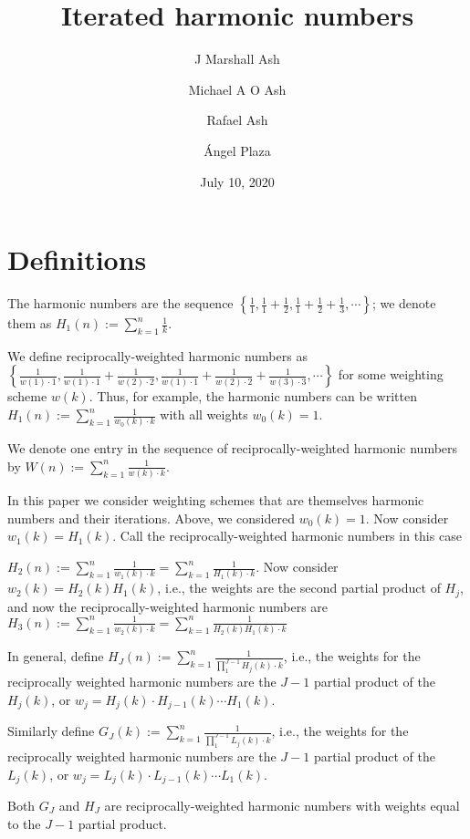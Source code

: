 \documentclass{article}
\begin{document}
\title{Iterated harmonic numbers}
\author{J Marshall Ash \and Michael A O Ash \and Rafael Ash \and \'{A}ngel
Plaza}
\date{July 10, 2020}
\maketitle


\section{Definitions}

The harmonic numbers are the sequence $\left\{ \frac{1}{1},\frac{1}{1}+\frac{1}{2},\frac{1}{1}+\frac{1}{2}+\frac{1}{3},\cdots \right\} $; we denote them as $H_{1}\left( n\right) :=\sum_{k=1}^{n}\frac{1}{k}$. 

We define reciprocally-weighted harmonic numbers as $\left\{ \frac{1}{w(1) \cdot 1},\frac{1}{w(1) \cdot 1}+\frac{1}{w(2) \cdot 2},\frac{1}{w(1) \cdot 1}+\frac{1}{w(2) \cdot 2}+\frac{1}{w(3) \cdot 3},\cdots \right\} $ for some weighting scheme $w(k)$.  Thus, for example, the harmonic numbers can be written $H_{1}\left( n\right) :=\sum_{k=1}^{n}\frac{1}{w_0(k)\cdot k}$ with all weights $w_{0}(k)=1$.

We denote one entry in the sequence of reciprocally-weighted harmonic numbers by $W (n) := \sum_{k=1}^{n} \frac{1}{w(k)\cdot k}$.


In this paper we consider weighting schemes that are themselves harmonic numbers and their iterations. Above, we considered $w_0(k) =1$.  Now consider $w_1(k) = H_{1}(k) $. Call the reciprocally-weighted harmonic numbers in this case

$H_2 (n) := \sum_{k=1}^{n} \frac{1}{w_1(k)\cdot k} = \sum_{k=1}^{n} \frac{1}{H_1(k)\cdot k}$.  Now consider $w_2(k) = H_{2}(k)H_{1}(k) $, i.e., the weights are the second partial product of $H_j$, and now the reciprocally-weighted harmonic numbers are  $H_3 (n) := \sum_{k=1}^{n} \frac{1}{w_2(k)\cdot k} = \sum_{k=1}^{n} \frac{1}{H_{2}(k)H_{1}(k) \cdot k}$

In general, define  $ H_{J}(n) :=   \sum_{k=1}^{n} \frac{1}{\prod_1^{J-1}H_{j}(k)\cdot k} $, i.e., the weights for the reciprocally weighted harmonic numbers are the $J-1$ partial product of the $ H_j(k)$, or $w_j = H_j(k) \cdot H_{j-1}(k) \cdots H_1(k) $.

Similarly define $ G_{J}(k) :=   \sum_{k=1}^{n} \frac{1}{\prod_1^{J-1}L_{j}(k)\cdot k} $, i.e., the weights for the reciprocally weighted harmonic numbers are the $J-1$ partial product of the $ L_j(k)$, or $w_j = L_j(k) \cdot L_{j-1}(k) \cdots L_1(k) $.



Both $G_J$ and $H_J$ are  reciprocally-weighted harmonic numbers with weights equal to the $J-1$ partial product.
\end{document}
